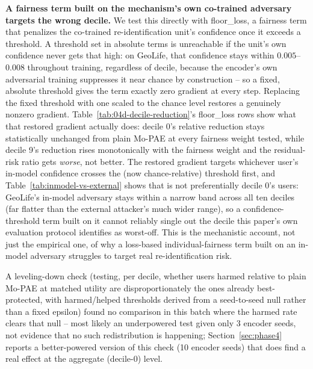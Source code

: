\textbf{A fairness term built on the mechanism's own co-trained
adversary targets the wrong decile.} We test this directly with
floor\_loss, a fairness term that penalizes the co-trained
re-identification unit's confidence once it exceeds a threshold. A
threshold set in absolute terms is unreachable if the unit's own
confidence never gets that high: on GeoLife, that confidence stays
within $0.005$--$0.008$ throughout training, regardless of decile,
because the encoder's own adversarial training suppresses it near
chance by construction -- so a fixed, absolute threshold gives the term
exactly zero gradient at every step. Replacing the fixed threshold with
one scaled to the chance level restores a genuinely nonzero gradient.
Table~\ref{tab:04d-decile-reduction}'s floor\_loss rows show what that
restored gradient actually does: decile 0's relative reduction stays
statistically unchanged from plain Mo-PAE at every fairness weight
tested, while decile 9's reduction rises monotonically with the
fairness weight and the residual-risk ratio gets \emph{worse}, not
better. The restored gradient targets whichever user's in-model
confidence crosses the (now chance-relative) threshold first, and
Table~\ref{tab:inmodel-vs-external} shows that is not preferentially
decile 0's users: GeoLife's in-model adversary stays within a narrow
band across all ten deciles (far flatter than the external attacker's
much wider range), so a confidence-threshold term built on it cannot
reliably single out the decile this paper's own evaluation protocol
identifies as worst-off. This is the mechanistic account, not just the
empirical one, of why a loss-based individual-fairness term built on an
in-model adversary struggles to target real re-identification risk.

A leveling-down check (testing, per decile, whether users harmed
relative to plain Mo-PAE at matched utility are disproportionately the
ones already best-protected, with harmed/helped thresholds derived from
a seed-to-seed null rather than a fixed epsilon) found no comparison
in this batch where the harmed rate clears that null -- most likely an
underpowered test given only 3 encoder seeds, not evidence that no such
redistribution is happening; Section~\ref{sec:phase4} reports a
better-powered version of this check (10 encoder seeds) that does find
a real effect at the aggregate (decile-0) level.

